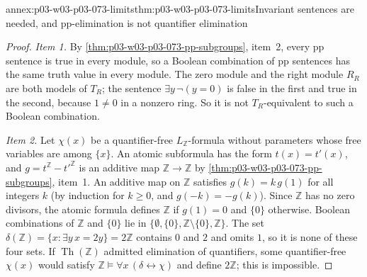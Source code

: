 \begin{annexitem}{annex:p03-w03-p03-073-limits}{thm:p03-w03-p03-073-limits}{Invariant sentences are needed, and pp-elimination is not quantifier elimination}
\begin{proof}
\emph{Item 1.} By \cref{thm:p03-w03-p03-073-pp-subgroups}, item~2, every pp
sentence is true in every module, so a Boolean combination of pp sentences
has the same truth value in every module. The zero module and the right
module \(R_R\) are both models of \(T_R\); the sentence
\(\exists y\,\neg(y=0)\) is false in the first and true in the second,
because \(1\neq0\) in a nonzero ring. So it is not \(T_R\)-equivalent to
such a Boolean combination.

\emph{Item 2.} Let \(\chi(x)\) be a quantifier-free \(L_{\mathbb Z}\)-formula
without parameters whose free variables are among \(\{x\}\). An atomic
subformula has the form \(t(x)=t'(x)\), and
\(g=t^{\mathbb Z}-t'^{\mathbb Z}\) is an additive map
\(\mathbb Z\to\mathbb Z\) by \cref{thm:p03-w03-p03-073-pp-subgroups},
item~1. An additive map on \(\mathbb Z\) satisfies \(g(k)=k\,g(1)\) for
all integers \(k\) (by induction for \(k\ge0\), and \(g(-k)=-g(k)\)). Since
\(\mathbb Z\) has no zero divisors, the atomic formula defines
\(\mathbb Z\) if \(g(1)=0\) and \(\{0\}\) otherwise. Boolean combinations of
\(\mathbb Z\) and \(\{0\}\) lie in
\(\{\emptyset,\{0\},\mathbb Z\setminus\{0\},\mathbb Z\}\). The set
\(\delta(\mathbb Z)=\{x:\exists y\,x=2y\}=2\mathbb Z\) contains \(0\) and
\(2\) and omits \(1\), so it is none of these four sets. If
\(\operatorname{Th}(\mathbb Z)\) admitted elimination of quantifiers, some
quantifier-free \(\chi(x)\) would satisfy
\(\mathbb Z\models\forall x\,(\delta\leftrightarrow\chi)\) and define
\(2\mathbb Z\); this is impossible.
\end{proof}
\end{annexitem}
